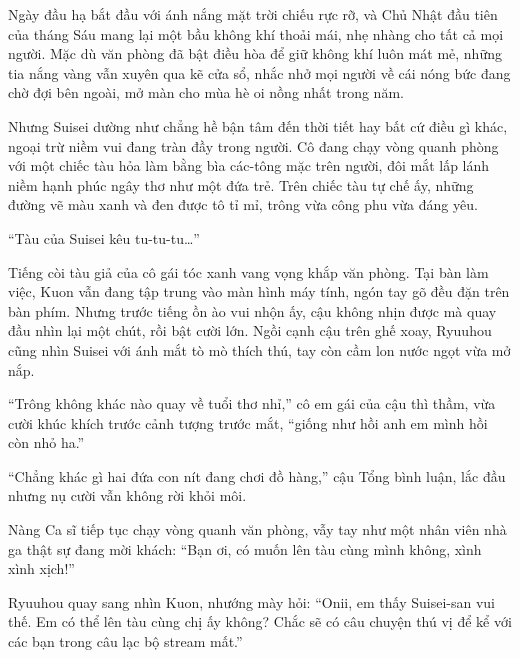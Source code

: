 \documentclass[../main.tex]{subfiles}
\begin{document}

Ngày đầu hạ bắt đầu với ánh nắng mặt trời chiếu rực rỡ, và Chủ Nhật đầu tiên của tháng Sáu mang lại một bầu không khí thoải mái, nhẹ nhàng cho tất cả mọi người. Mặc dù văn phòng đã bật điều hòa để giữ không khí luôn mát mẻ, những tia nắng vàng vẫn xuyên qua kẽ cửa sổ, nhắc nhở mọi người về cái nóng bức đang chờ đợi bên ngoài, mở màn cho mùa hè oi nồng nhất trong năm.

Nhưng Suisei dường như chẳng hề bận tâm đến thời tiết hay bất cứ điều gì khác, ngoại trừ niềm vui đang tràn đầy trong người. Cô đang chạy vòng quanh phòng với một chiếc tàu hỏa làm bằng bìa các-tông mặc trên người, đôi mắt lấp lánh niềm hạnh phúc ngây thơ như một đứa trẻ. Trên chiếc tàu tự chế ấy, những đường vẽ màu xanh và đen được tô tỉ mỉ, trông vừa công phu vừa đáng yêu.

``Tàu của Suisei kêu tu-tu-tu\dots''

Tiếng còi tàu giả của cô gái tóc xanh vang vọng khắp văn phòng. Tại bàn làm việc, Kuon vẫn đang tập trung vào màn hình máy tính, ngón tay gõ đều đặn trên bàn phím. Nhưng trước tiếng ồn ào vui nhộn ấy, cậu không nhịn được mà quay đầu nhìn lại một chút, rồi bật cười lớn. Ngồi cạnh cậu trên ghế xoay, Ryuuhou cũng nhìn Suisei với ánh mắt tò mò thích thú, tay còn cầm lon nước ngọt vừa mở nắp.

``Trông không khác nào quay về tuổi thơ nhỉ,'' cô em gái của cậu thì thầm, vừa cười khúc khích trước cảnh tượng trước mắt, ``giống như hồi anh em mình hồi còn nhỏ ha.''

``Chẳng khác gì hai đứa con nít đang chơi đồ hàng,'' cậu Tổng bình luận, lắc đầu nhưng nụ cười vẫn không rời khỏi môi.

Nàng Ca sĩ tiếp tục chạy vòng quanh văn phòng, vẫy tay như một nhân viên nhà ga thật sự đang mời khách: ``Bạn ơi, có muốn lên tàu cùng mình không, xình xình xịch!''

Ryuuhou quay sang nhìn Kuon, nhướng mày hỏi: ``Onii, em thấy Suisei-san vui thế. Em có thể lên tàu cùng chị ấy không? Chắc sẽ có câu chuyện thú vị để kể với các bạn trong câu lạc bộ stream mất.''
\end{document}
